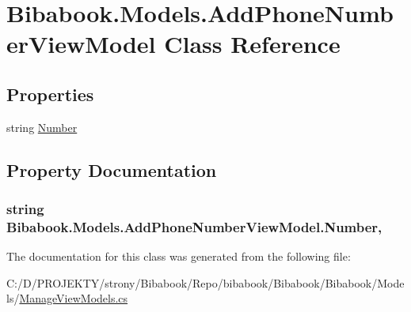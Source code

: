 \hypertarget{class_bibabook_1_1_models_1_1_add_phone_number_view_model}{}\section{Bibabook.\+Models.\+Add\+Phone\+Number\+View\+Model Class Reference}
\label{class_bibabook_1_1_models_1_1_add_phone_number_view_model}
\subsection*{Properties}
\begin{DoxyCompactItemize}
\item 
string \hyperlink{class_bibabook_1_1_models_1_1_add_phone_number_view_model_ac0b78522b0d793430ddc708827bbc135}{Number}
\end{DoxyCompactItemize}


\subsection{Property Documentation}
\hypertarget{class_bibabook_1_1_models_1_1_add_phone_number_view_model_ac0b78522b0d793430ddc708827bbc135}{}
\subsubsection[{Number}]{\setlength{\rightskip}{0pt plus 5cm}string Bibabook.\+Models.\+Add\+Phone\+Number\+View\+Model.\+Number\hspace{0.3cm}{\ttfamily [get]}, {\ttfamily [set]}}\label{class_bibabook_1_1_models_1_1_add_phone_number_view_model_ac0b78522b0d793430ddc708827bbc135}


The documentation for this class was generated from the following file\+:\begin{DoxyCompactItemize}
\item 
C\+:/\+D/\+P\+R\+O\+J\+E\+K\+T\+Y/strony/\+Bibabook/\+Repo/bibabook/\+Bibabook/\+Bibabook/\+Models/\hyperlink{_manage_view_models_8cs}{Manage\+View\+Models.\+cs}\end{DoxyCompactItemize}
